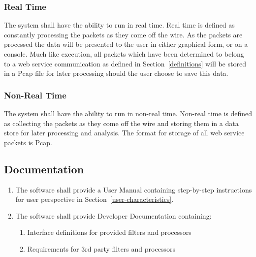 \documentclass[titlepage]{article}
\begin{document}

\subsubsection{Real Time}\label{realtime} 
The system shall have the ability to run in real time. Real time is defined as
constantly processing the packets as they come off the wire. As the packets are
processed the data will be presented to the user in either graphical form, or
on a console.  Much like  execution, all packets which
have been determined to belong to a web service communication as defined in
Section~\ref{definitions} will be stored in a Pcap file for later processing
should the user choose to save this data.


\subsubsection{Non-Real Time}\label{nonrealtime}
The system shall have the ability to run in non-real time. Non-real time is
defined as collecting the packets as they come off the wire and storing them in
a data store for later processing and analysis.  The format for storage of all  
web service packets is Pcap.


\subsection{Documentation%
  \label{documentation}%
}
\begin{enumerate}
    \item The software shall provide a User Manual containing  step-by-step
        instructions for user perspective in Section~\ref{user-characteristics}.
    \item The software shall provide Developer Documentation containing:
    \begin{enumerate}
        \item Interface definitions for provided filters and processors
        \item Requirements for 3rd party filters and processors
    \end{enumerate}
\end{enumerate}
\end{document}
